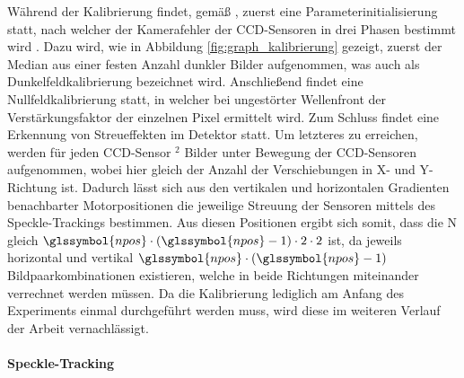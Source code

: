 Während der Kalibrierung findet, gemäß \citeauthor{Ber13}, zuerst eine Parameterinitialisierung statt, nach welcher der Kamerafehler der \gls{CCD}-Sensoren in drei Phasen bestimmt wird . Dazu wird, wie in Abbildung \ref{fig:graph_kalibrierung} gezeigt, zuerst der Median aus einer festen Anzahl dunkler Bilder aufgenommen, was auch als Dunkelfeldkalibrierung bezeichnet wird. Anschließend findet eine Nullfeldkalibrierung statt, in welcher bei ungestörter Wellenfront der Verstärkungsfaktor der einzelnen Pixel ermittelt wird. Zum Schluss findet eine Erkennung von Streueffekten im Detektor statt. Um letzteres zu erreichen, werden für jeden \gls{CCD}-Sensor $^2$ Bilder unter Bewegung der \gls{CCD}-Sensoren aufgenommen, wobei  hier gleich der Anzahl der Verschiebungen in X- und Y-Richtung ist. Dadurch lässt sich aus den vertikalen und horizontalen Gradienten benachbarter Motorpositionen die jeweilige Streuung der Sensoren mittels des Speckle-Trackings bestimmen. Aus diesen  Positionen ergibt sich somit, dass die \gls{N} gleich $\glssymbol{npos} \cdot \left(\glssymbol{npos} - 1\right) \cdot 2 \cdot 2$ ist, da jeweils horizontal und vertikal $\glssymbol{npos} \cdot \left(\glssymbol{npos} - 1\right)$ Bildpaarkombinationen existieren, welche in beide Richtungen miteinander verrechnet werden müssen. Da die Kalibrierung lediglich am Anfang des Experiments einmal durchgeführt werden muss, wird diese im weiteren Verlauf der Arbeit vernachlässigt. 

\paragraph{Speckle-Tracking}
\label{sec:speckle-tracking}

